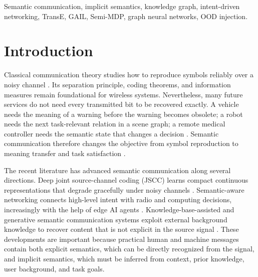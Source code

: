 \documentclass[journal]{IEEEtran}
\begin{document}
\begin{IEEEkeywords}
Semantic communication, implicit semantics, knowledge graph, intent-driven networking, TransE, GAIL, Semi-MDP, graph neural networks, OOD injection.
\end{IEEEkeywords}

\section{Introduction}

Classical communication theory studies how to reproduce symbols reliably over a noisy channel \cite{shannon1948mathematical}. Its separation principle, coding theorems, and information measures remain foundational for wireless systems. Nevertheless, many future services do not need every transmitted bit to be recovered exactly. A vehicle needs the meaning of a warning before the warning becomes obsolete; a robot needs the next task-relevant relation in a scene graph; a remote medical controller needs the semantic state that changes a decision \cite{peng2026simac,krayani2026aav,wheeler2025causal}. Semantic communication therefore changes the objective from symbol reproduction to meaning transfer and task satisfaction \cite{shannonweaver1949,nguyen2025survey,zhang2020semantics}.

The recent literature has advanced semantic communication along several directions. Deep joint source-channel coding (JSCC) learns compact continuous representations that degrade gracefully under noisy channels \cite{bourtsoulatze2019deep,yang2022ofdm,gunduz2025jscc,kurka2020feedback,yang2025swinjscc}. Semantic-aware networking connects high-level intent with radio and computing decisions, increasingly with the help of edge AI agents \cite{qin2025genai,sun2026edge,jiang2026agentic}. Knowledge-base-assisted and generative semantic communication systems exploit external background knowledge to recover content that is not explicit in the source signal \cite{xiao2024reasoning,fang2026cross,peng2026simac}. These developments are important because practical human and machine messages contain both explicit semantics, which can be directly recognized from the signal, and implicit semantics, which must be inferred from context, prior knowledge, user background, and task goals.
\end{document}
